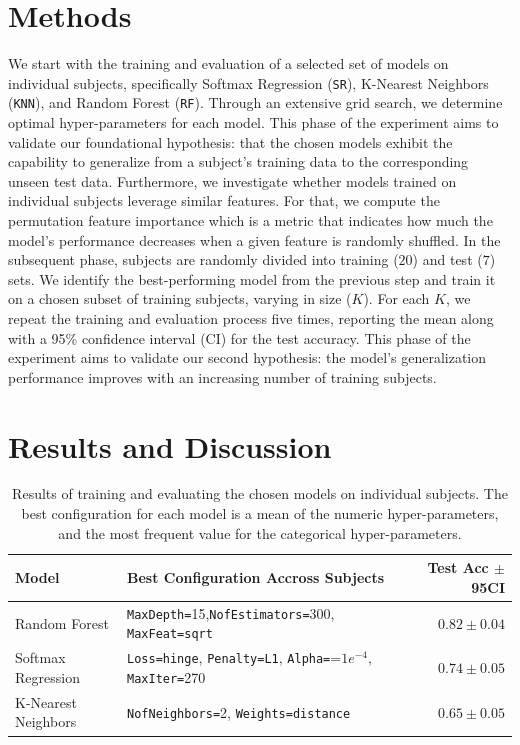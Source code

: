\documentclass[10pt]{article}
\begin{document}
\section{Methods}
We start with the training and evaluation of a selected set of models on individual subjects, 
specifically Softmax Regression (\texttt{SR}), K-Nearest Neighbors (\texttt{KNN}), and Random Forest (\texttt{RF}). 
Through an extensive grid search, we determine optimal hyper-parameters for each model. 
This phase of the experiment aims to validate our foundational hypothesis: that the chosen models exhibit the capability to generalize 
from a subject's training data to the corresponding unseen test data. 
Furthermore, we investigate whether models trained on individual subjects leverage similar features. For that, we compute the permutation
feature importance which is a metric that indicates how much the model's performance decreases when a given feature is randomly shuffled. 
In the subsequent phase, subjects are randomly divided into training ($20$) and test ($7$) sets. 
We identify the best-performing model from the previous step and train it 
on a chosen subset of training subjects, varying in size ($K$). For each $K$, we repeat the training 
and evaluation process five times, reporting the mean along with a 95\% confidence interval (CI) 
for the test accuracy. This phase of the experiment aims to validate our second hypothesis: the model's generalization 
performance improves with an increasing number of training subjects.

\section{Results and Discussion}
\begin{table}[!h]
    \centering
    \begin{tabular}{llr}
        \toprule
        \textbf{Model} & \textbf{Best Configuration Accross Subjects} & \textbf{Test Acc $\pm$ 95CI} \\
        \midrule
        Random Forest & \texttt{MaxDepth=}15,\texttt{NofEstimators=}300, \texttt{MaxFeat=}\texttt{sqrt} & $\mathbf{0.82 \pm0.04}$ \\
        Softmax Regression & \texttt{Loss=hinge}, \texttt{Penalty=L1}, \texttt{Alpha=}=$1e^{-4}$, \texttt{MaxIter=}270 &  $0.74 \pm0.05$ \\
        K-Nearest Neighbors & \texttt{NofNeighbors=}2, \texttt{Weights=distance} &  $0.65 \pm0.05$ \\
        \bottomrule
    \end{tabular}
    \caption{Results of training and evaluating the chosen models on individual subjects. 
    The best configuration for each model is a mean of the numeric hyper-parameters, 
    and the most frequent value for the categorical hyper-parameters.}
    \label{tab:results1}
\end{table}
\end{document}
